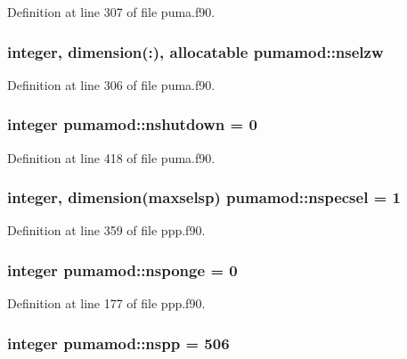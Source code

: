 \-Definition at line 307 of file puma.\-f90.

\hypertarget{classpumamod_a14bc87e591fb027289ef3d9eb40b8a70}{
\subsubsection[{nselzw}]{\setlength{\rightskip}{0pt plus 5cm}integer, dimension(\-:), allocatable {\bf pumamod\-::nselzw}}}
\label{classpumamod_a14bc87e591fb027289ef3d9eb40b8a70}


\-Definition at line 306 of file puma.\-f90.

\hypertarget{classpumamod_a55d8354fd0488524eb882076f145db4c}{
\subsubsection[{nshutdown}]{\setlength{\rightskip}{0pt plus 5cm}integer {\bf pumamod\-::nshutdown} = 0}}
\label{classpumamod_a55d8354fd0488524eb882076f145db4c}


\-Definition at line 418 of file puma.\-f90.

\hypertarget{classpumamod_a2c894b8fdb5ec54ea52d347187671e2c}{
\subsubsection[{nspecsel}]{\setlength{\rightskip}{0pt plus 5cm}integer, dimension(maxselsp) {\bf pumamod\-::nspecsel} = 1}}
\label{classpumamod_a2c894b8fdb5ec54ea52d347187671e2c}


\-Definition at line 359 of file ppp.\-f90.

\hypertarget{classpumamod_adb0a88ab45e621b010dc35fb9648b4e4}{
\subsubsection[{nsponge}]{\setlength{\rightskip}{0pt plus 5cm}integer {\bf pumamod\-::nsponge} = 0}}
\label{classpumamod_adb0a88ab45e621b010dc35fb9648b4e4}


\-Definition at line 177 of file ppp.\-f90.

\hypertarget{classpumamod_a21fc1a421eaa018055d3e84704d8e594}{
\subsubsection[{nspp}]{\setlength{\rightskip}{0pt plus 5cm}integer {\bf pumamod\-::nspp} = 506}}
\label{classpumamod_a21fc1a421eaa018055d3e84704d8e594}


